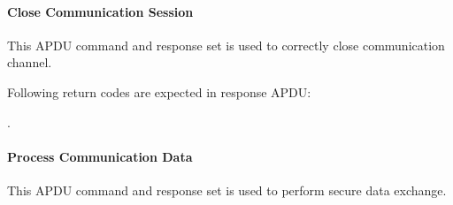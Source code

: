 \documentclass[]{llncs}
\begin{document}
\paragraph{Close Communication Session }
This APDU command and response set is used to correctly close  communication channel.


\begin{table}[!htbp]
\caption{Close Session command APDU}
\label{close-session-apdu}
\end{table}

Following return codes are expected in response APDU:

.\begin{table}[!htbp]
\caption{Close Session Return Code}
\label{close-session-response-apdu}
\end{table}

\paragraph{Process Communication Data }
This APDU command and response set is used to perform secure data exchange.


\begin{table}[!htbp]
\caption{Process data command APDU}
\label{process-data-cmd-apdu}
\end{table}
\end{document}
